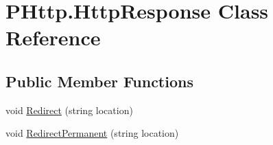\hypertarget{class_p_http_1_1_http_response}{}\section{P\+Http.\+Http\+Response Class Reference}
\label{class_p_http_1_1_http_response}
\subsection*{Public Member Functions}
\begin{DoxyCompactItemize}
\item 
void \hyperlink{class_p_http_1_1_http_response_a5b53f914c9325785bfec60d574b4c56a}{Redirect} (string location)
\item 
void \hyperlink{class_p_http_1_1_http_response_ab17d0a301980de9576fd51b0b131101f}{Redirect\+Permanent} (string location)
\end{DoxyCompactItemize}
